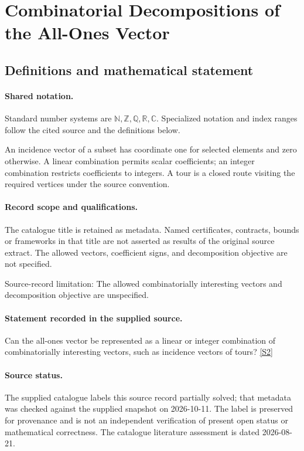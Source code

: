 \documentclass[11pt]{article}
\newcommand{\sref}[2]{\hyperlink{source:#1:#2}{[S#2]}}
\begin{document}
\section{Combinatorial Decompositions of the All-Ones Vector}\label{statement}

\subsection{Definitions and mathematical statement}

\paragraph{Shared notation.}Standard number systems are $\mathbb N,\mathbb Z,\mathbb Q,\mathbb R,\mathbb C$. Specialized notation and index ranges follow the cited source and the definitions below.


An incidence vector of a subset has coordinate one for selected elements and zero otherwise. A linear combination permits scalar coefficients; an integer combination restricts coefficients to integers. A tour is a closed route visiting the required vertices under the source convention.
\paragraph{Record scope and qualifications.}
The catalogue title is retained as metadata. Named certificates, contracts, bounds or frameworks in that title are not asserted as results of the original source extract.
The allowed vectors, coefficient signs, and decomposition objective are not specified.

Source-record limitation: The allowed combinatorially interesting vectors and decomposition objective are unspecified.
\paragraph{Statement recorded in the supplied source.}
Can the all-ones vector be represented as a linear or integer combination of combinatorially interesting vectors, such as incidence vectors of tours? \sref{statement}{2}
\paragraph{Source status.}
The supplied catalogue labels this source record partially solved; that metadata was checked against the supplied snapshot on 2026-10-11. The label is preserved for provenance and is not an independent verification of present open status or mathematical correctness. The catalogue literature assessment is dated 2026-08-21.
\end{document}
